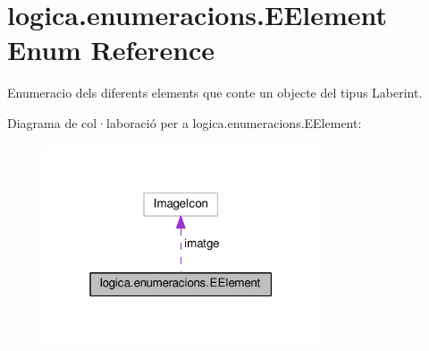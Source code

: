 \hypertarget{enumlogica_1_1enumeracions_1_1_e_element}{\section{logica.\+enumeracions.\+E\+Element Enum Reference}
\label{enumlogica_1_1enumeracions_1_1_e_element}
}


Enumeracio dels diferents elements que conte un objecte del tipus Laberint.  




Diagrama de col·laboració per a logica.\+enumeracions.\+E\+Element\+:
\nopagebreak
\begin{figure}[H]
\begin{center}
\leavevmode
\includegraphics[width=232pt]{enumlogica_1_1enumeracions_1_1_e_element__coll__graph}
\end{center}
\end{figure}
